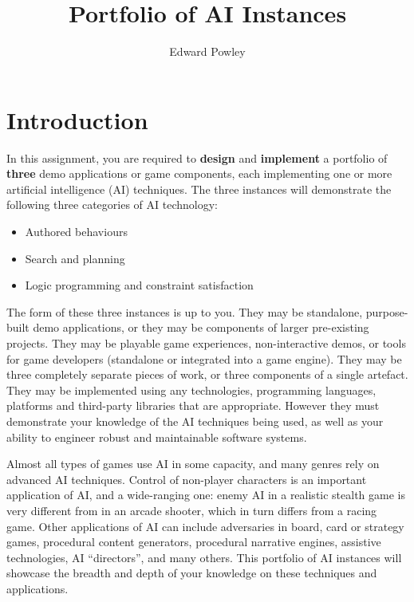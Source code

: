 \documentclass{../../fal_assignment}
\title{Portfolio of AI Instances}
\author{Edward Powley}
\begin{document}
\maketitle

\section*{Introduction}

%

In this assignment, you are required to \textbf{design} and \textbf{implement} a portfolio of \textbf{three} demo applications or game components,
each implementing one or more artificial intelligence (AI) techniques.
The three instances will demonstrate the following three categories of AI technology:
\begin{itemize}
    \item Authored behaviours
    \item Search and planning
    \item Logic programming and constraint satisfaction
\end{itemize}

The form of these three instances is up to you.
They may be standalone, purpose-built demo applications,
or they may be components of larger pre-existing projects.
They may be playable game experiences, non-interactive demos, or tools for game developers (standalone or integrated into a game engine).
They may be three completely separate pieces of work, or three components of a single artefact.
They may be implemented using any technologies, programming languages, platforms and third-party libraries that are appropriate.
However they must demonstrate your knowledge of the AI techniques being used,
as well as your ability to engineer robust and maintainable software systems.

Almost all types of games use AI in some capacity, and many genres rely on advanced AI techniques.
Control of non-player characters is an important application of AI,
and a wide-ranging one: enemy AI in a realistic stealth game is very different from in an arcade shooter,
which in turn differs from a racing game.
Other applications of AI can include adversaries in board, card or strategy games,
procedural content generators,
procedural narrative engines,
assistive technologies,
AI ``directors'',
and many others.
This portfolio of AI instances will showcase the breadth and depth of your knowledge on these techniques and applications.
\end{document}
